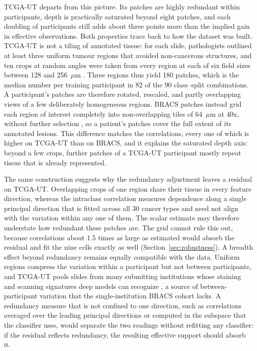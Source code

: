 TCGA-UT departs from this picture. Its patches are highly redundant within participants, depth is practically saturated beyond eight patches, and each doubling of participants still adds about three points more than the implied gain in effective observations. Both properties trace back to how the dataset was built. TCGA-UT is not a tiling of annotated tissue: for each slide, pathologists outlined at least three uniform tumour regions that avoided non-cancerous structures, and ten crops at random angles were taken from every region at each of six field sizes between 128 and 256~$\mu$m \citep{komura2022universalEncoding}. Three regions thus yield 180 patches, which is the median number per training participant in 82 of the 90 class--split combinations. A participant's patches are therefore rotated, rescaled, and partly overlapping views of a few deliberately homogeneous regions. BRACS patches instead grid each region of interest completely into non-overlapping tiles of 64~$\mu$m at 40x, without further selection \citep{brancati2022bracs}, so a patient's patches cover the full extent of its annotated lesions. This difference matches the correlations, every one of which is higher on TCGA-UT than on BRACS, and it explains the saturated depth axis: beyond a few crops, further patches of a TCGA-UT participant mostly repeat tissue that is already represented.

The same construction suggests why the redundancy adjustment leaves a residual on TCGA-UT. Overlapping crops of one region share their tissue in every feature direction, whereas the intraclass correlation measures dependence along a single principal direction that is fitted across all 30 cancer types and need not align with the variation within any one of them. The scalar estimate may therefore understate how redundant these patches are. The grid cannot rule this out, because correlations about 1.5 times as large as estimated would absorb the residual and fit the nine cells exactly as well (Section~\ref{sec:robustness}). A breadth effect beyond redundancy remains equally compatible with the data. Uniform regions compress the variation within a participant but not between participants, and TCGA-UT pools slides from many submitting institutions whose staining and scanning signatures deep models can recognize \citep{howard2021impact}, a source of between-participant variation that the single-institution BRACS cohort lacks. A redundancy measure that is not confined to one direction, such as correlations averaged over the leading principal directions or computed in the subspace that the classifier uses, would separate the two readings without refitting any classifier: if the residual reflects redundancy, the resulting effective support should absorb it.

